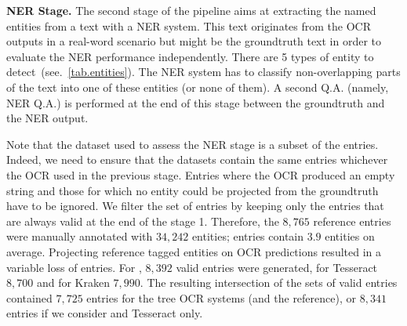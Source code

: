 \textbf{NER Stage.} The second stage of the pipeline aims at extracting the named entities from a text with a NER
system. This text originates from the OCR outputs in a real-word scenario but might be the groundtruth text in order to
evaluate the NER performance independently. There are 5 types of entity to detect~(see.~\cref{tab.entities}).
The NER system has to classify non-overlapping parts of the text into one of these entities (or none of them). A second
Q.A. (namely, NER Q.A.) is performed at the end of this stage between the groundtruth and the NER output.

Note that the dataset used to assess the NER stage is a subset of the entries. Indeed, we need to ensure that the datasets
contain the same entries whichever the OCR used in the previous stage. Entries where the OCR produced an empty string
and those for which no entity could be projected from the groundtruth have to be ignored. 
We filter the set of entries by keeping only the entries that are always valid at the end of the stage 1.
Therefore, the $8,765$ reference entries were manually annotated with $34,242$ entities; entries contain $3.9$ entities on average.
Projecting reference tagged entities on OCR predictions resulted in a variable loss of entries.
For \peroocr, $8,392$ valid entries were generated, for Tesseract $8,700$ and for Kraken $7,990$.
The resulting intersection of the sets of valid entries contained $7,725$ entries for the tree OCR systems (and the reference),
or $8,341$ entries if we consider \peroocr and Tesseract only.


